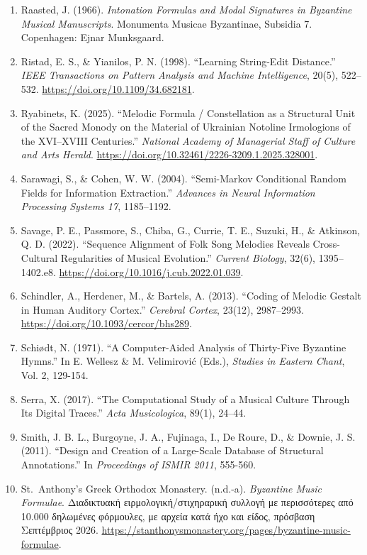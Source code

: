 \documentclass[11pt,a4paper]{article}
\begin{document}
\begin{enumerate}
\item
 Raasted, J. (1966). \emph{Intonation Formulas and Modal Signatures in Byzantine Musical Manuscripts}. Monumenta Musicae Byzantinae, Subsidia 7. Copenhagen: Ejnar Munksgaard.
\item
 Ristad, E. S., \& Yianilos, P. N. (1998). ``Learning String-Edit Distance.'' \emph{IEEE Transactions on Pattern Analysis and Machine Intelligence}, 20(5), 522--532. \url{https://doi.org/10.1109/34.682181}.
\item
 Ryabinets, K. (2025). ``Melodic Formula / Constellation as a Structural Unit of the Sacred Monody on the Material of Ukrainian Notoline Irmologions of the XVI--XVIII Centuries.'' \emph{National Academy of Managerial Staff of Culture and Arts Herald}. \url{https://doi.org/10.32461/2226-3209.1.2025.328001}.
\item
 Sarawagi, S., \& Cohen, W. W. (2004). ``Semi-Markov Conditional Random Fields for Information Extraction.'' \emph{Advances in Neural Information Processing Systems 17}, 1185--1192.
\item
 Savage, P. E., Passmore, S., Chiba, G., Currie, T. E., Suzuki, H., \& Atkinson, Q. D. (2022). ``Sequence Alignment of Folk Song Melodies Reveals Cross-Cultural Regularities of Musical Evolution.'' \emph{Current Biology}, 32(6), 1395--1402.e8. \url{https://doi.org/10.1016/j.cub.2022.01.039}.
\item
 Schindler, A., Herdener, M., \& Bartels, A. (2013). ``Coding of Melodic Gestalt in Human Auditory Cortex.'' \emph{Cerebral Cortex}, 23(12), 2987--2993. \url{https://doi.org/10.1093/cercor/bhs289}.
\item
 Schiødt, N. (1971). ``A Computer-Aided Analysis of Thirty-Five Byzantine Hymns.'' In E. Wellesz \& M. Velimirović (Eds.), \emph{Studies in Eastern Chant}, Vol. 2, 129-154.
\item
 Serra, X. (2017). ``The Computational Study of a Musical Culture Through Its Digital Traces.'' \emph{Acta Musicologica}, 89(1), 24--44.
\item
 Smith, J. B. L., Burgoyne, J. A., Fujinaga, I., De Roure, D., \& Downie, J. S. (2011). ``Design and Creation of a Large-Scale Database of Structural Annotations.'' In \emph{Proceedings of ISMIR 2011}, 555-560.
\item
 St.~Anthony's Greek Orthodox Monastery. (n.d.-a). \emph{Byzantine Music Formulae}. Διαδικτυακή ειρμολογική/στιχηραρική συλλογή με περισσότερες από 10.000 δηλωμένες φόρμουλες, με αρχεία κατά ήχο και είδος, πρόσβαση Σεπτέμβριος 2026. \url{https://stanthonysmonastery.org/pages/byzantine-music-formulae}.

\end{enumerate}
\end{document}

